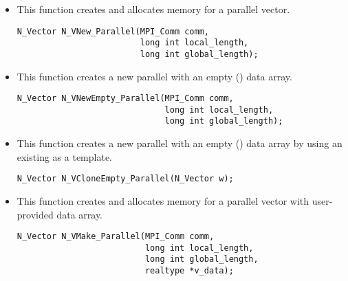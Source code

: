 \begin{itemize}


\item  {}
  
  This function creates and allocates memory for a parallel vector.
 
  

\begin{verbatim}
N_Vector N_VNew_Parallel(MPI_Comm comm, 
                         long int local_length, 
                         long int global_length);
\end{verbatim}
  

\item {}
 
  This function creates a new parallel  with an empty () data array.
 
  

\begin{verbatim}
N_Vector N_VNewEmpty_Parallel(MPI_Comm comm, 
                              long int local_length, 
                              long int global_length);
\end{verbatim}

  

\item {}
 
  This function creates a new parallel  with an empty () data array
  by using an existing  as a template.
 
  

  \verb|N_Vector N_VCloneEmpty_Parallel(N_Vector w);|
  

\item {}
  
  This function creates and allocates memory for a parallel vector
  with user-provided data array.
 
  

\begin{verbatim}
N_Vector N_VMake_Parallel(MPI_Comm comm, 
                          long int local_length,
                          long int global_length,
                          realtype *v_data);
\end{verbatim}


\end{itemize}
